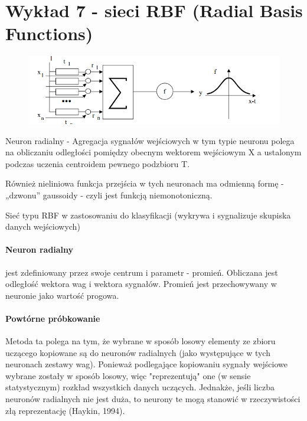 \section{Wykład 7 - sieci RBF (Radial Basis Functions)}

\begin{figure}[H]
 \centering
 \includegraphics[scale=0.6]{radial}
\end{figure}

Neuron radialny - Agregacja sygnałów wejściowych
w tym typie neuronu polega na 
obliczaniu odległości pomiędzy 
obecnym wektorem wejściowym X
a ustalonym podczas uczenia 
centroidem pewnego podzbioru T.

Również nieliniowa funkcja 
przejścia w tych neuronach ma 
odmienną formę - „dzwonu” 
gaussoidy - czyli jest funkcją
niemonotoniczną.

Sieć typu RBF 
w zastosowaniu 
do klasyfikacji 
(wykrywa
i sygnalizuje 
skupiska 
danych 
wejściowych)

\paragraph{Neuron radialny} jest zdefiniowany przez swoje centrum i parametr - promień.
Obliczana jest odległość wektora wag i wektora sygnałów. Promień jest przechowywany
w neuronie jako wartość progowa.

\paragraph{Powtórne próbkowanie} Metoda ta polega na tym, że wybrane w sposób 
losowy elementy ze zbioru uczącego kopiowane są do neuronów radialnych 
(jako występujące w tych neuronach zestawy wag). Ponieważ podlegające 
kopiowaniu sygnały wejściowe wybrane zostały w sposób losowy, więc 
"reprezentują" one (w sensie statystycznym) rozkład wszystkich danych 
uczących. Jednakże, jeśli liczba neuronów radialnych nie jest duża, to neurony 
te mogą stanowić w rzeczywistości złą reprezentację (Haykin, 1994).


